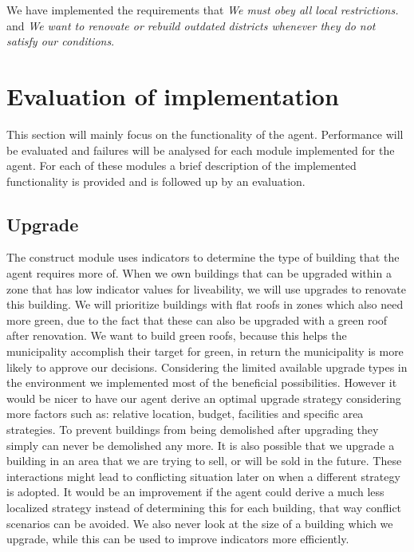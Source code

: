 We have implemented the requirements that \emph{We must obey all local restrictions.} and \emph{We want to renovate or rebuild outdated districts whenever they do not satisfy our conditions}.

\section{Evaluation of implementation} 
This section will mainly focus on the functionality of the agent. Performance will be evaluated and failures will be analysed for each module implemented for the agent. For each of these modules a brief description of the implemented functionality is provided and is followed up by an evaluation. 

\subsection{Upgrade}
The construct module uses indicators to determine the type of building that the agent requires more of. When we own buildings that can be upgraded within a zone that has low indicator values for liveability, we will use upgrades to renovate this building. We will prioritize buildings with flat roofs in zones which also need more green, due to the fact that these can also be upgraded with a green roof after renovation. 
We want to build green roofs, because this helps the municipality accomplish their target for green, in return the municipality is more likely to approve our decisions. 
Considering the limited available upgrade types in the environment we implemented most of the beneficial possibilities. However it would be nicer to have our agent derive an optimal upgrade strategy considering more factors such as: relative location, budget, facilities and specific area strategies. To prevent buildings from being demolished after upgrading they simply can never be demolished any more. It is also possible that we upgrade a building in an area that we are trying to sell, or will be sold in the future. These interactions might lead to conflicting situation later on when a different strategy is adopted. It would be an improvement if the agent could derive a much less localized strategy instead of determining this for each building, that way conflict scenarios can be avoided. We also never look at the size of a building which we upgrade, while this can be used to improve indicators more efficiently. 

